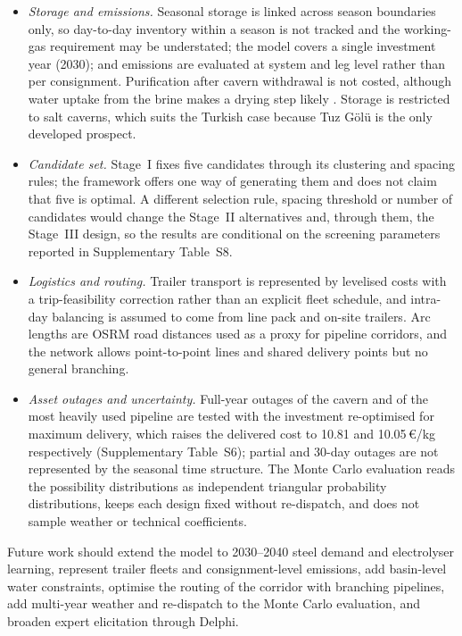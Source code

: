 \documentclass[preprint,12pt,authoryear]{elsarticle}
\begin{document}
\begin{itemize}
    \item \textit{Storage and emissions.} Seasonal storage is linked across season boundaries only, so day-to-day inventory within a season is not tracked and the working-gas requirement may be understated; the model covers a single investment year (2030); and emissions are evaluated at system and leg level rather than per consignment. Purification after cavern withdrawal is not costed, although water uptake from the brine makes a drying step likely \citep{janssen2025assessment}. Storage is restricted to salt caverns, which suits the Turkish case because Tuz Gölü is the only developed prospect.
    \item \textit{Candidate set.} Stage~I fixes five candidates through its clustering and spacing rules; the framework offers one way of generating them and does not claim that five is optimal. A different selection rule, spacing threshold or number of candidates would change the Stage~II alternatives and, through them, the Stage~III design, so the results are conditional on the screening parameters reported in Supplementary Table~S8.
    \item \textit{Logistics and routing.} Trailer transport is represented by levelised costs with a trip-feasibility correction rather than an explicit fleet schedule, and intra-day balancing is assumed to come from line pack and on-site trailers. Arc lengths are OSRM road distances used as a proxy for pipeline corridors, and the network allows point-to-point lines and shared delivery points but no general branching.
    \item \textit{Asset outages and uncertainty.} Full-year outages of the cavern and of the most heavily used pipeline are tested with the investment re-optimised for maximum delivery, which raises the delivered cost to 10.81 and 10.05\,€/kg respectively (Supplementary Table~S6); partial and 30-day outages are not represented by the seasonal time structure. The Monte Carlo evaluation reads the possibility distributions as independent triangular probability distributions, keeps each design fixed without re-dispatch, and does not sample weather or technical coefficients.
\end{itemize}

Future work should extend the model to 2030--2040 steel demand and electrolyser learning, represent trailer fleets and consignment-level emissions, add basin-level water constraints, optimise the routing of the corridor with branching pipelines, add multi-year weather and re-dispatch to the Monte Carlo evaluation, and broaden expert elicitation through Delphi.
\end{document}
